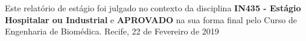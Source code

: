 % 
\begin{folhadeaprovacao}
  \begin{center}
    {\ABNTEXchapterfont\large\imprimirautor}
    \vspace*{\fill}\vspace*{\fill}
    \begin{center}
      \ABNTEXchapterfont\bfseries\Large\imprimirtitulo
    \end{center}
    \vspace*{\fill}
    Este relatório de estágio foi julgado no contexto da disciplina \textbf{IN435 - Estágio Hospitalar ou Industrial} e \textbf{APROVADO} na sua forma final pelo Curso de Engenharia de Biomédica.
    \vspace*{\fill}
    Recife, 22 de Fevereiro de 2019
  \end{center}

\makeatother
\end{folhadeaprovacao}
